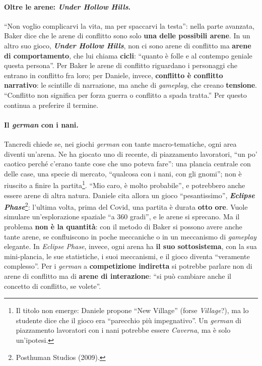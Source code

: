 \paragraph{Oltre le arene: \emph{Under Hollow Hills}.} ``Non voglio complicarvi la vita, ma per
spaccarvi la testa'': nella parte avanzata, Baker dice che le arene di conflitto sono solo
\textbf{una delle possibili arene}. In un altro suo gioco, \textbf{\emph{Under Hollow Hills}}, non ci
sono arene di conflitto ma \textbf{arene di comportamento}, che lui chiama \textbf{cicli}: ``quanto è
folle e al contempo geniale questa persona''. Per Baker le arene di conflitto riguardano i personaggi
che entrano in conflitto fra loro; per Daniele, invece, \textbf{conflitto è conflitto narrativo}: le
scintille di narrazione, ma anche di \emph{gameplay}, che creano \textbf{tensione}. ``Conflitto non
significa per forza guerra o conflitto a spada tratta.'' Per questo continua a preferire il termine.

\paragraph{Il \emph{german} con i nani.} Tancredi chiede se, nei giochi \emph{german} con tante
macro-tematiche, ogni area diventi un'arena. Ne ha giocato uno di recente, di piazzamento lavoratori,
``un po' caotico perché c'erano tante cose che uno poteva fare'': una plancia centrale con delle case,
una specie di mercato, ``qualcosa con i nani, con gli gnomi''; non è riuscito a finire la
partita\footnote{Il titolo non emerge: Daniele propone ``New Village'' (forse \emph{Village}?), ma lo
studente dice che il gioco era ``parecchio più impegnativo''. Un \emph{german} di piazzamento
lavoratori con i nani potrebbe essere \emph{Caverna}, ma è solo un'ipotesi.}. ``Mio caro, è molto
probabile'', e potrebbero anche essere arene di altra natura. Daniele cita allora un gioco
``pesantissimo'', \textbf{\emph{Eclipse Phase}}\footnote{Posthuman Studios (2009).}: l'ultima volta,
prima del Covid, una partita è durata \textbf{otto ore}. Vuole simulare un'esplorazione spaziale ``a
360 gradi'', e le arene si sprecano. Ma il problema \textbf{non è la quantità}: con il metodo di
Baker si possono avere anche tante arene, se confluiscono in poche meccaniche o in un meccanismo di
\emph{gameplay} elegante. In \emph{Eclipse Phase}, invece, ogni arena ha \textbf{il suo sottosistema},
con la sua mini-plancia, le sue statistiche, i suoi meccanismi, e il gioco diventa ``veramente
complesso''. Per i \emph{german} a \textbf{competizione indiretta} si potrebbe parlare non di arene
di conflitto ma di \textbf{arene di interazione}: ``si può cambiare anche il concetto di conflitto, se
volete''.

